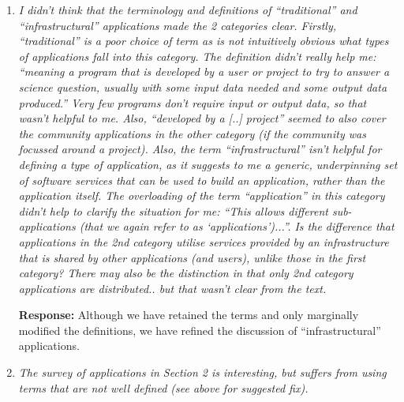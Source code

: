 \documentclass{article}
\newcommand{\katznote}[1]{{\textcolor{magenta} { ***Dan: #1 }}}
\newcommand{\katznote}[1]{}
\begin{document}
\begin{enumerate}
\textbf{Response:} \katznote{attention needed here}

\katznote{partial response:} In addition, recognizing that the two reviewers have different styles of reading
and different areas of expertise (as do we as authors), we have added a paragraph at the end
of Section 1 to explain how different types of readers might want to approach this paper.  We do
not believe that there is one single way of organizing it that would satisfy all readers.  We have also
added a longer description of each section at this same place.

\hspace{-0.7cm}Section 2. 

\item \emph{I didn't think that the terminology and definitions of ``traditional'' and ``infrastructural'' applications made the 2 categories clear. Firstly, ``traditional'' is a poor choice of term as is not intuitively obvious what types of applications fall into this category. The definition didn't really help me: ``meaning a program that is developed by a user or project to try to answer a science question, usually with some input data needed and some output data produced.'' Very few programs don't require input or output data, so that wasn't helpful to me. Also, ``developed by a [..] project'' seemed to also cover the community applications in the other category (if the community was focussed around a project). Also, the term ``infrastructural'' isn't helpful for defining a type of application, as it suggests to me a generic, underpinning set of software services that can be used to build an application, rather than the application itself. The overloading of the term ``application'' in this category didn't help to clarify the situation for me: ``This allows different sub-applications (that we again refer to as `applications')...''. Is the difference that applications in the 2nd category utilise services provided by an infrastructure that is shared by other applications (and users), unlike those in the first category? There may also be the distinction in that only 2nd category applications are distributed.. but that wasn't clear from the text.} 


\textbf{Response:} Although we have retained the terms and only marginally modified the definitions, we have refined the discussion of ``infrastructural'' applications.

\item \emph{The survey of applications in Section 2 is interesting, but suffers from using terms that are not well defined (see above for suggested fix).}


\end{enumerate}
\end{document}
